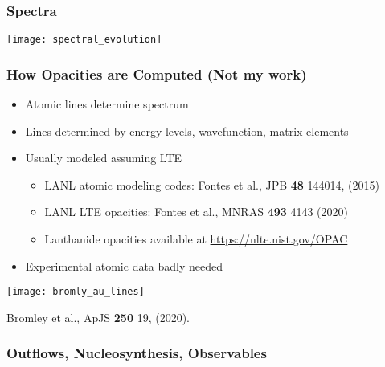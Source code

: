 \documentclass[]{beamer}
\begin{document}
\begin{frame}
  \frametitle{Spectra}
  \begin{center}
    \texttt{[image: spectral\_evolution]}
  \end{center}
\end{frame}

\begin{frame}
  \frametitle{How Opacities are Computed (Not my work)}
  \begin{itemize}
  \item Atomic lines determine spectrum
  \item Lines determined by energy levels, wavefunction, matrix elements
  \item Usually modeled assuming LTE    \begin{itemize}
    \item LANL atomic modeling codes: Fontes et al., JPB \textbf{48}
      144014, (2015)
    \item LANL LTE opacities: Fontes et al., MNRAS \textbf{493} 4143 (2020)
    \item Lanthanide opacities available at \url{https://nlte.nist.gov/OPAC}
    \end{itemize}
  \item Experimental atomic data badly needed
  \end{itemize}
  \begin{center}
    \texttt{[image: bromly\_au\_lines]}\\
    \begin{small}
      Bromley et al., ApJS \textbf{250} 19, (2020).
    \end{small}
  \end{center}
\end{frame}

\begin{frame}
  \frametitle{Outflows, Nucleosynthesis, Observables}
  \begin{center}
  \end{center}
\end{frame}
\end{document}

